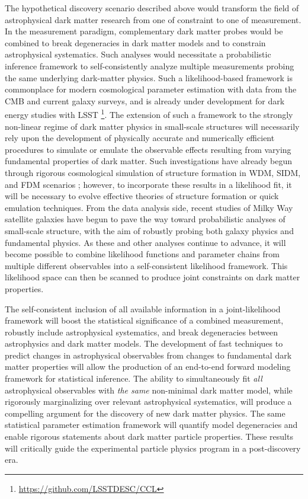 The hypothetical discovery scenario described above would transform the field of astrophysical dark matter research from one of constraint to one of measurement.
In the measurement paradigm, complementary dark matter probes would be combined to break degeneracies in dark matter models and to constrain astrophysical systematics.
Such analyses would necessitate a probabilistic inference framework to self-consistently analyze multiple measurements probing the same underlying dark-matter physics. 
Such a likelihood-based framework is commonplace for modern cosmological parameter estimation with data from the CMB and current galaxy surveys, and is already under development for dark energy studies with LSST \citep{DESC:CCL}\footnote{\url{https://github.com/LSSTDESC/CCL}}. 
The extension of such a framework to the strongly non-linear regime of dark matter physics in small-scale structures will necessarily rely upon the development of physically accurate and numerically efficient procedures to simulate or emulate the observable effects resulting from varying fundamental properties of dark matter.
Such investigations have already begun through rigorous cosmological simulation of structure formation in WDM, SIDM, and FDM scenarios \citep[\eg,][]{Lovell:2013ola,Dooley:2016ajo,1807.06018,1811.11791}; however, to incorporate these results in a likelihood fit, it will be necessary to evolve effective theories of structure formation \citep[\eg,][]{Cyr-Racine:2015ihg} or quick emulation techniques.
From the data analysis side, recent studies of Milky Way satellite galaxies \citep[\eg,][]{Jethwa:2018,Nadler:2018} have begun to pave the way toward probabilistic analyses of small-scale structure, with the aim of robustly probing both galaxy physics and fundamental physics.
As these and other analyses continue to advance, it will become possible to combine likelihood functions and parameter chains from multiple different observables into a self-consistent likelihood framework. 
This likelihood space can then be scanned to produce joint constraints on dark matter properties.

The self-consistent inclusion of all available information in a joint-likelihood framework will boost the statistical significance of a combined measurement, robustly include astrophysical systematics, and break degeneracies between astrophysics and dark matter models.
The development of fast techniques to predict changes in astrophysical observables from changes to fundamental dark matter properties will allow the production of an end-to-end forward modeling framework for statistical inference.
The ability to simultaneously fit \textit{all} astrophysical observables with \emph{the same} non-minimal dark matter model, while rigorously marginalizing over relevant astrophysical systematics, will produce a compelling argument for the discovery of new dark matter physics.
The same statistical parameter estimation framework will quantify model degeneracies and enable rigorous statements about dark matter particle properties.
These results will critically guide the experimental particle physics program in a post-discovery era.


